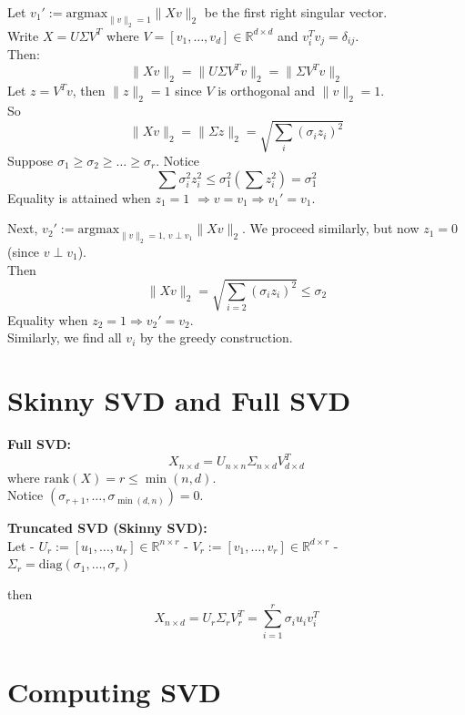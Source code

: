 \documentclass[
  letterpaper,
  DIV=11,
  numbers=noendperiod]{scrreprt}
\theoremstyle{definition}
\theoremstyle{plain}
\theoremstyle{plain}
\theoremstyle{definition}
\theoremstyle{plain}
\theoremstyle{plain}
\theoremstyle{remark}
\begin{document}
\begin{refproof}
Let \(v_1' := \mathrm{argmax}_{\|v\|_2=1} \|Xv\|_2\) be the first right
singular vector.\\
Write \(X = U \Sigma V^T\) where
\(V = [v_1, \dots, v_d] \in \mathbb{R}^{d \times d}\) and
\(v_i^T v_j = \delta_{ij}\).\\
Then: \[
\|Xv\|_2 = \|U \Sigma V^T v\|_2 = \|\Sigma V^T v\|_2
\] Let \(z = V^T v\), then \(\|z\|_2 = 1\) since \(V\) is orthogonal and
\(\|v\|_2 = 1\).\\
So \[
\|Xv\|_2 = \|\Sigma z\|_2 = \sqrt{\sum_{i} (\sigma_i z_i)^2}
\] Suppose \(\sigma_1 \geq \sigma_2 \geq \dots \geq \sigma_r\). Notice
\[
\sum \sigma_i^2 z_i^2 \leq \sigma_1^2 \left(\sum z_i^2\right) = \sigma_1^2
\] Equality is attained when \(z_1 = 1\)
\(\Rightarrow v = v_1 \Rightarrow v_1' = v_1\).

Next, \(v_2' := \mathrm{argmax}_{\|v\|_2=1,\, v \perp v_1} \|Xv\|_2\).
We proceed similarly, but now \(z_1 = 0\) (since \(v \perp v_1\)).\\
Then \[
\|Xv\|_2 = \sqrt{\sum_{i=2} (\sigma_i z_i)^2} \leq \sigma_2
\] Equality when \(z_2 = 1 \Rightarrow v_2' = v_2\).\\
Similarly, we find all \(v_i\) by the greedy construction.

\label{prf-svd-greedy}

\end{refproof}

\section{Skinny SVD and Full SVD}\label{skinny-svd-and-full-svd}

\textbf{Full SVD:}\\
\[
X_{n \times d} = U_{n \times n} \Sigma_{n \times d} V_{d \times d}^T
\] where \(\mathrm{rank}(X) = r \leq \min(n, d)\).\\
Notice \((\sigma_{r+1}, \dots, \sigma_{\min(d,n)}) = 0\).

\textbf{Truncated SVD (Skinny SVD):}\\
Let - \(U_r := [u_1, \dots, u_r] \in \mathbb{R}^{n \times r}\) -
\(V_r := [v_1, \dots, v_r] \in \mathbb{R}^{d \times r}\) -
\(\Sigma_r = \mathrm{diag}(\sigma_1, \dots, \sigma_r)\)

then \[
X_{n \times d} = U_r \Sigma_r V_r^T = \sum_{i=1}^{r} \sigma_i u_i v_i^T
\]

\section{Computing SVD}\label{computing-svd}
\end{document}
